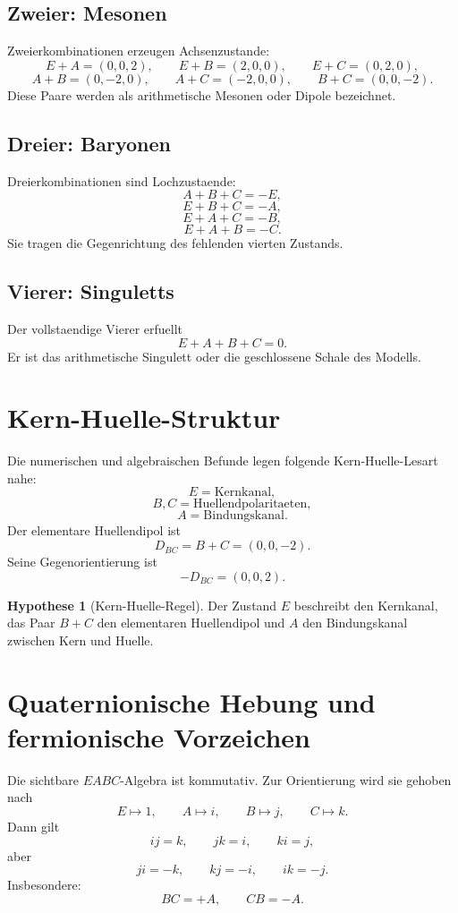 \documentclass[11pt,a4paper]{article}
\theoremstyle{definition}
\newtheorem{hypothese}[satz]{Hypothese}
\theoremstyle{remark}
\begin{document}
\subsection{Zweier: Mesonen}

Zweierkombinationen erzeugen Achsenzustande:
\[
E+A=(0,0,2),\qquad E+B=(2,0,0),\qquad E+C=(0,2,0),
\]
\[
A+B=(0,-2,0),\qquad A+C=(-2,0,0),\qquad B+C=(0,0,-2).
\]
Diese Paare werden als arithmetische Mesonen oder Dipole bezeichnet.

\subsection{Dreier: Baryonen}

Dreierkombinationen sind Lochzustaende:
\[
A+B+C=-E,
\]
\[
E+B+C=-A,
\]
\[
E+A+C=-B,
\]
\[
E+A+B=-C.
\]
Sie tragen die Gegenrichtung des fehlenden vierten Zustands.

\subsection{Vierer: Singuletts}

Der vollstaendige Vierer erfuellt
\[
E+A+B+C=0.
\]
Er ist das arithmetische Singulett oder die geschlossene Schale des Modells.

\section{Kern-Huelle-Struktur}

Die numerischen und algebraischen Befunde legen folgende Kern-Huelle-Lesart nahe:
\[
E=\text{Kernkanal},
\]
\[
B,C=\text{Huellendpolaritaeten},
\]
\[
A=\text{Bindungskanal}.
\]
Der elementare Huellendipol ist
\[
D_{BC}=B+C=(0,0,-2).
\]
Seine Gegenorientierung ist
\[
-D_{BC}=(0,0,2).
\]

\begin{hypothese}[Kern-Huelle-Regel]
Der Zustand \(E\) beschreibt den Kernkanal, das Paar \(B+C\) den elementaren
Huellendipol und \(A\) den Bindungskanal zwischen Kern und Huelle.
\end{hypothese}

\section{Quaternionische Hebung und fermionische Vorzeichen}

Die sichtbare \(EABC\)-Algebra ist kommutativ. Zur Orientierung wird sie gehoben
nach
\[
E\mapsto 1,
\qquad
A\mapsto i,
\qquad
B\mapsto j,
\qquad
C\mapsto k.
\]
Dann gilt
\[
ij=k,
\qquad
jk=i,
\qquad
ki=j,
\]
aber
\[
ji=-k,
\qquad
kj=-i,
\qquad
ik=-j.
\]
Insbesondere:
\[
BC=+A,
\qquad
CB=-A.
\]
\end{document}
